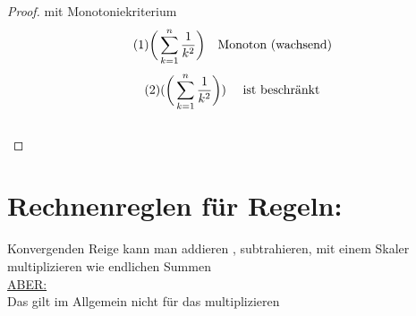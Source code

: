\begin{proof}{mit Monotoniekriterium}
\begin{equation}
(1)\bigg(\sum_{k=1}^n {\frac{1}{k^2}} \bigg) \text{\quad Monoton (wachsend)} 
\end{equation}
\begin{equation}
(2)(\bigg(\sum_{k=1}^n {\frac{1}{k^2}} \bigg)) \text{ \quad ist beschränkt}
\end{equation}  \\




\end{proof}
\section{Rechnenreglen für Regeln:}
Konvergenden Reige kann man addieren , subtrahieren, mit einem Skaler multiplizieren  wie endlichen Summen \\ \underline{ABER:} \\
Das gilt im Allgemein nicht für das multiplizieren
